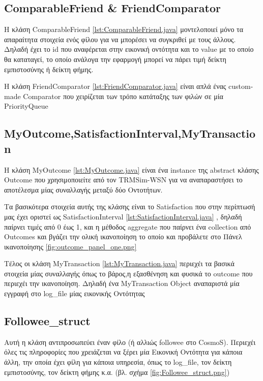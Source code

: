 
\subsection{ComparableFriend \& FriendComparator}
 Η κλάση ComparableFriend \ref{lst:ComparableFriend.java} μοντελοποιεί μόνο τα απαραίτητα στοιχεία ενός φίλου για να μπορέσει να συγκριθεί με τους άλλους. Δηλαδή έχει το id που αναφέρεται στην εικονική οντότητα και το value με το οποίο θα καταταγεί, το οποίο ανάλογα την εφαρμογή μπορεί να πάρει τιμή δείκτη εμπιστοσύνης ή δείκτη φήμης.

 
Η κλάση FriendComparator \ref{lst:FriendComparator.java} είναι απλά ένας custom-made Comparator που χειρίζεται των τρόπο κατάταξης των φιλών σε μία PriorityQueue
 
 
\newpage


\subsection{MyOutcome,SatisfactionInterval,MyTransaction}

Η κλάση MyOutcome \ref{lst:MyOutcome.java} είναι ένα instance της abstract κλάσης Outcome που χρησιμοποιείτε από τον TRMSim-WSN για να αναπαραστήσει το αποτέλεσμα μίας συναλλαγής μεταξύ δύο Οντοτήτων.
 
 
  Τα βασικότερα στοιχεία αυτής της κλάσης είναι το Satisfaction που στην περίπτωσή μας έχει οριστεί ως SatisfactionInterval  \ref{lst:SatisfactionInterval.java} , δηλαδή παίρνει τιμές από 0 έως 1, και η μέθοδος aggregate  που παίρνει ένα collection από Outcomes και βγάζει την ολική ικανοποίηση το οποίο και προβάλετε στο Πάνελ ικανοποίησης \ref{fig:outcome_panel_one.png}

Tέλος οι κλάση MyTransaction \ref{lst:MyTransaction.java} περιεχέι τα βασικά στοιχεία μίας συναλλαγής όπως το βάρος,η εξασθένηση και φυσικά το outcome που περιεχέι την ικανοποίηση. Δηλαδή ένα MyTransaction Object αναπαριστά μία εγγραφή στο log\_file μίας εικονικής Οντότητας


\subsection{Followee\_struct}
Αυτή η κλάση αντιπροσωπεύει έναν φίλο (ή αλλιώς followee στο CosmoS). Περιεχέι όλες τις πληροφορίες που χρειάζεται να ξέρει μία Εικονική Οντότητα για κάποια άλλη, την οποία έχει φίλη για κάποια υπηρεσία, όπως το log\_file, τον δείκτη εμπιστοσύνης, τον δείκτη φήμης κ.α. (βλ. σχήμα \ref{fig:Followee_struct.png})

